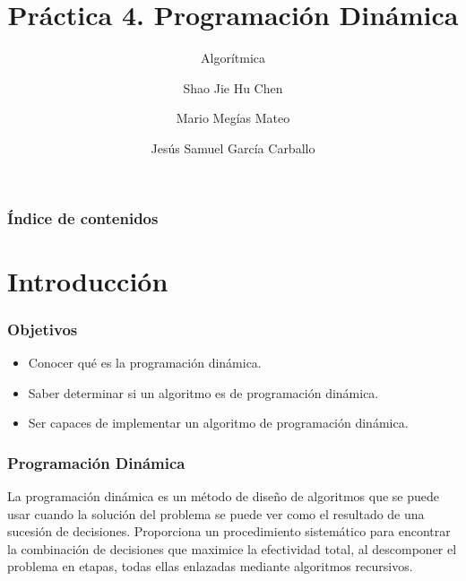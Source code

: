 \documentclass[13pt]{beamer}
\author{Shao Jie Hu Chen \and Mario Megías Mateo \and Jesús Samuel García Carballo}
\title{Práctica 4. Programación Dinámica}
\subtitle{Algorítmica}
\institute{Equipo Rojo}
\begin{document}
	
	\begin{frame}[plain]
		\maketitle
	\end{frame}
	
	\begin{frame}
		\frametitle{Índice de contenidos}
		\tableofcontents
	\end{frame}


    \section{Introducción}

	\begin{frame}
		\frametitle{Objetivos}
        \begin{itemize}
            \item Conocer qué es la programación dinámica.
            \item Saber determinar si un algoritmo es de programación dinámica.
            \item Ser capaces de implementar un algoritmo de programación dinámica.
        \end{itemize}
	\end{frame}

	\begin{frame}
		\frametitle{Programación Dinámica}
        La programación dinámica es un método de diseño de algoritmos que se puede usar cuando la solución del 
        problema se puede ver como el resultado de una sucesión de decisiones. 
        Proporciona un procedimiento sistemático para encontrar la combinación de decisiones que maximice la efectividad
        total, al descomponer el problema en etapas, todas ellas enlazadas mediante algoritmos recursivos.
	\end{frame}
\end{document}

